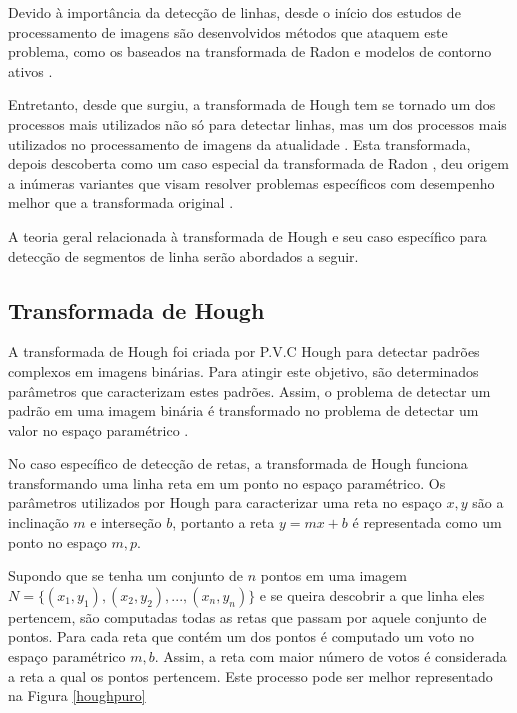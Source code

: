 Devido à importância da detecção de linhas, desde o início dos estudos de processamento de imagens são desenvolvidos métodos que ataquem este problema, como os baseados na transformada de Radon \cite{linhanavio,radon00} e modelos de contorno ativos \cite{contorno00,contorno01}.

Entretanto, desde que surgiu, a transformada de Hough tem se tornado um dos processos mais utilizados não só para detectar linhas, mas um dos processos mais utilizados no processamento de imagens da atualidade \cite{houghhistory}. Esta transformada, depois descoberta como um caso especial da transformada de Radon \cite{houghradon}, deu origem a inúmeras variantes que visam resolver problemas específicos com desempenho melhor que a transformada original \cite{houghalt00,houghalt01,houghalt02,houghalt03}.

A teoria geral relacionada à transformada de Hough e seu caso específico para detecção de segmentos de linha serão abordados a seguir.

\subsection{Transformada de Hough}

A transformada de Hough foi criada por P.V.C Hough para detectar padrões complexos em imagens binárias. Para atingir este objetivo, são determinados parâmetros que caracterizam estes padrões. Assim, o problema de detectar um padrão em uma imagem binária é transformado no problema de detectar um valor no espaço paramétrico \cite{houghintro01}.


No caso específico de detecção de retas, a transformada de Hough funciona transformando uma linha reta em um ponto no espaço paramétrico. Os parâmetros utilizados por Hough para caracterizar uma reta no espaço $x,y$ são a inclinação $m$ e interseção $b$, portanto a reta $y = mx+b$ é representada como um ponto no espaço $m,p$.

Supondo que se tenha um conjunto de $n$ pontos em uma imagem $N = \{(x_1,y_1),(x_2,y_2),...,(x_n,y_n)\}$  e se queira descobrir a que linha eles pertencem, são computadas todas as retas que passam por aquele conjunto de pontos. Para cada reta que contém um dos pontos é computado um voto no espaço paramétrico $m,b$. Assim, a reta com maior número de votos é considerada a reta a qual os pontos pertencem. Este processo pode ser melhor representado na Figura \ref{houghpuro}

